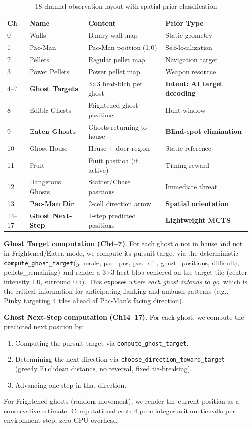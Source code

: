\documentclass[11pt,a4paper]{article}
\theoremstyle{definition}
\begin{document}
\begin{table}[ht]
\centering
\small
\caption{18-channel observation layout with spatial prior classification}
\label{tab:channels}
\begin{tabular}{@{}p{0.8cm}p{2.4cm}p{4.5cm}p{4cm}@{}}
\toprule
\textbf{Ch} & \textbf{Name} & \textbf{Content} & \textbf{Prior Type} \\
\midrule
0 & Walls & Binary wall map & Static geometry \\
1 & Pac-Man & Pac-Man position (1.0) & Self-localization \\
2 & Pellets & Regular pellet map & Navigation target \\
3 & Power Pellets & Power pellet map & Weapon resource \\
4--7 & \textbf{Ghost Targets} & 3$\times$3 heat-blob per ghost & \textbf{Intent: AI target decoding} \\
8 & Edible Ghosts & Frightened ghost positions & Hunt window \\
9 & \textbf{Eaten Ghosts} & Ghosts returning to house & \textbf{Blind-spot elimination} \\
10 & Ghost House & House + door region & Static reference \\
11 & Fruit & Fruit position (if active) & Timing reward \\
12 & Dangerous Ghosts & Scatter/Chase positions & Immediate threat \\
13 & \textbf{Pac-Man Dir} & 2-cell direction arrow & \textbf{Spatial orientation} \\
14--17 & \textbf{Ghost Next-Step} & 1-step predicted positions & \textbf{Lightweight MCTS} \\
\bottomrule
\end{tabular}
\end{table}

\textbf{Ghost Target computation (Ch4--7).}
For each ghost $g$ not in house and not in Frightened/Eaten mode, we compute its pursuit target via the deterministic \texttt{compute\_ghost\_target}($g$, mode, pac\_pos, pac\_dir, ghost\_positions, difficulty, pellets\_remaining) and render a 3$\times$3 heat blob centered on the target tile (center intensity 1.0, surround 0.5).
This exposes \textit{where each ghost intends to go}, which is the critical information for anticipating flanking and ambush patterns (e.g., Pinky targeting 4 tiles ahead of Pac-Man's facing direction).

\textbf{Ghost Next-Step computation (Ch14--17).}
For each ghost, we compute the predicted next position by:
\begin{enumerate}[nosep]
    \item Computing the pursuit target via \texttt{compute\_ghost\_target}.
    \item Determining the next direction via \texttt{choose\_direction\_toward\_target} (greedy Euclidean distance, no reversal, fixed tie-breaking).
    \item Advancing one step in that direction.
\end{enumerate}
For Frightened ghosts (random movement), we render the current position as a conservative estimate.
Computational cost: 4 pure integer-arithmetic calls per environment step, zero GPU overhead.
\end{document}
